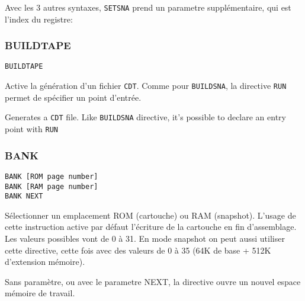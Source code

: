 \begin{xfr}
Avec les 3 autres syntaxes, \texttt{SETSNA} prend un parametre supplémentaire, qui est l'index du registre:
\end{xfr}










\subsubsection{BUILDTAPE}
\begin{verbatim}
BUILDTAPE
\end{verbatim}

\begin{xfr}
Active la génération d'un fichier \texttt{CDT}. Comme pour \texttt{BUILDSNA}, la directive \texttt{RUN} permet de spécifier un point d'entrée.
\end{xfr}

\begin{xen}
Generates a \texttt{CDT} file. Like \texttt{BUILDSNA} directive, it's possible to declare an entry point with  \texttt{RUN}
\end{xen}




\subsubsection{BANK}\label{BANK}
\begin{verbatim}
BANK [ROM page number]
BANK [RAM page number]
BANK NEXT
\end{verbatim}

\begin{xfr}
Sélectionner un emplacement ROM (cartouche) ou RAM (snapshot). L'usage de cette instruction active par défaut l'écriture de la cartouche en fin d'assemblage.
Les valeurs possibles vont de 0 à 31. En mode snapshot on peut aussi utiliser cette directive, cette fois avec des valeurs de 0 à 35 (64K de base + 512K d'extension mémoire).

Sans paramètre, ou avec le parametre NEXT, la directive ouvre un nouvel espace mémoire de travail.
\end{xfr}


